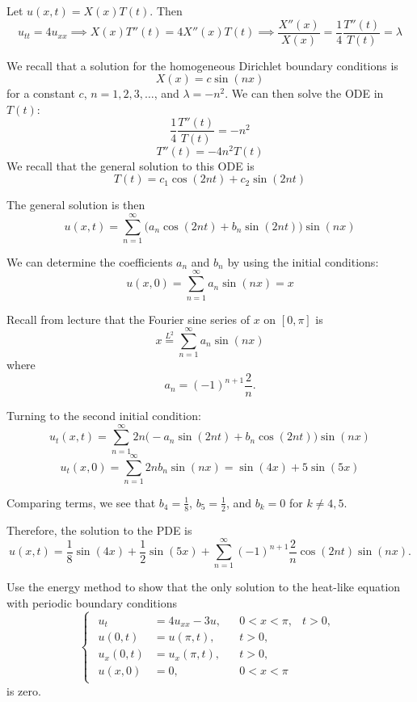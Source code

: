 \documentclass[plain]{pset}
\begin{document}
\begin{solution}
    Let \(u(x, t) = X(x)T(t)\). Then
    \[u_{tt} = 4u_{xx} \implies X(x)T''(t) = 4X''(x)T(t) \implies \frac{X''(x)}{X(x)} = \frac{1}{4}\frac{T''(t)}{T(t)} = \lambda\]

    We recall that a solution for the homogeneous Dirichlet boundary conditions is
    \[X(x) = c \sin(nx)\]
    for a constant \(c\), \(n = 1, 2, 3, \ldots\), and \(\lambda = -n^2\). We can then solve the ODE in \(T(t)\):
    \[\frac{1}{4}\frac{T''(t)}{T(t)} = -n^2\]
    \[T''(t) = -4n^2T(t)\]
    We recall that the general solution to this ODE is
    \[T(t) = c_1\cos(2nt) + c_2\sin(2nt)\]

    The general solution is then
    \[u(x, t) = \sum_{n=1}^\infty \bigl(a_n\cos(2nt) + b_n\sin(2nt)\bigr)\sin(nx)\]

    We can determine the coefficients \(a_n\) and \(b_n\) by using the initial conditions:
    \[u(x, 0) = \sum_{n=1}^\infty a_n \sin(nx) = x\]

    Recall from lecture that the Fourier sine series of \(x\) on \([0, \pi]\) is
    \[x \stackrel{L^2}{=} \sum_{n=1}^\infty a_n \sin(nx)\]
    where
    \[a_n = (-1)^{n+1} \frac{2}{n}.\]

    Turning to the second initial condition:
    \[u_t(x, t) = \sum_{n=1}^\infty 2n\bigl(-a_n\sin(2nt) + b_n\cos(2nt)\bigr)\sin(nx)\]
    \[u_t(x, 0) = \sum_{n=1}^\infty 2n b_n \sin(nx) = \sin(4x) + 5\sin(5x)\]

    Comparing terms, we see that \(b_4 = \frac{1}{8}\), \(b_5 = \frac{1}{2}\), and \(b_k = 0\) for \(k \neq 4, 5\).

    Therefore, the solution to the PDE is
    \[u(x, t) = \frac{1}{8}\sin(4x) + \frac{1}{2}\sin(5x) + \sum_{n=1}^\infty (-1)^{n+1} \frac{2}{n}\cos(2nt)\sin(nx).\]
\end{solution}

\pagebreak

\begin{problem}
Use the energy method to show that the only solution to the heat-like equation with periodic boundary conditions
\[
    \begin{cases}
        \begin{aligned}
            u_t       & = 4u_{xx} - 3u, &  & 0 < x < \pi, & t > 0, \\
            u(0, t)   & = u(\pi, t),    &  & t > 0,       &        \\
            u_x(0, t) & = u_x(\pi, t),  &  & t > 0,       &        \\
            u(x, 0)   & = 0,            &  & 0 < x < \pi
        \end{aligned}
    \end{cases}
\]
is zero.
\end{problem}
\end{document}
